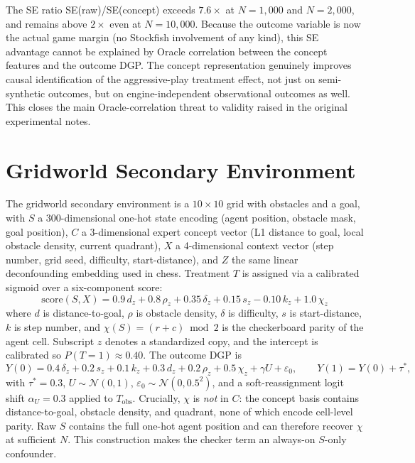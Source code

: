\documentclass{article}
\begin{document}
The SE ratio SE(raw)/SE(concept) exceeds $7.6\times$ at $N{=}1{,}000$ and
$N{=}2{,}000$, and remains above $2\times$ even at $N{=}10{,}000$. Because
the outcome variable is now the actual game margin (no Stockfish involvement
of any kind), this SE advantage cannot be explained by Oracle correlation
between the concept features and the outcome DGP. The concept representation
genuinely improves causal identification of the aggressive-play treatment
effect, not just on semi-synthetic outcomes, but on engine-independent
observational outcomes as well. This closes the main Oracle-correlation
threat to validity raised in the original experimental notes.

\section{Gridworld Secondary Environment}
\label{app:gridworld}
The gridworld secondary environment is a $10\times10$ grid with obstacles and
a goal, with $S$ a $300$-dimensional one-hot state encoding (agent position,
obstacle mask, goal position), $C$ a 3-dimensional expert concept vector
(L1 distance to goal, local obstacle density, current quadrant), $X$ a
4-dimensional context vector (step number, grid seed, difficulty,
start-distance), and $Z$ the same linear deconfounding embedding used in
chess. Treatment $T$ is assigned via a calibrated sigmoid over a
six-component score:
\[
\text{score}(S, X) = 0.9\,d_z + 0.8\,\rho_z + 0.35\,\delta_z + 0.15\,s_z - 0.10\,k_z + 1.0\,\chi_z
\]
where $d$ is distance-to-goal, $\rho$ is obstacle density, $\delta$ is
difficulty, $s$ is start-distance, $k$ is step number, and
$\chi(S) = (r+c)\bmod 2$ is the checkerboard parity of the agent cell.
Subscript $z$ denotes a standardized copy, and the intercept is calibrated
so $P(T{=}1) \approx 0.40$. The outcome DGP is
\[
Y(0) = 0.4\,\delta_z + 0.2\,s_z + 0.1\,k_z + 0.3\,d_z + 0.2\,\rho_z + 0.5\,\chi_z + \gamma U + \varepsilon_0,
\qquad Y(1) = Y(0) + \tau^*,
\]
with $\tau^* = 0.3$, $U \sim \mathcal{N}(0,1)$, $\varepsilon_0 \sim
\mathcal{N}(0, 0.5^2)$, and a soft-reassignment logit shift
$\alpha_U = 0.3$ applied to $T_{\text{obs}}$. Crucially, $\chi$ is \emph{not}
in $C$: the concept basis contains distance-to-goal, obstacle density, and
quadrant, none of which encode cell-level parity. Raw $S$ contains the full
one-hot agent position and can therefore recover $\chi$ at sufficient $N$.
This construction makes the checker term an always-on $S$-only confounder.
\end{document}
